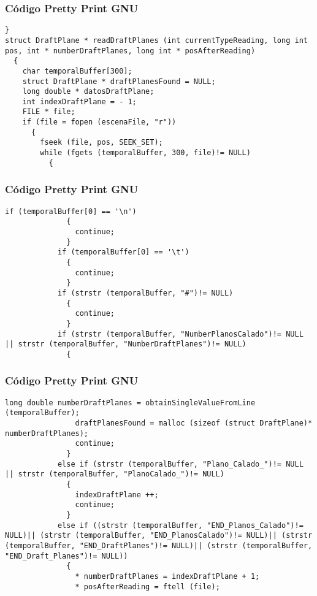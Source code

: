 \documentclass{beamer}
\begin{document}
\begin{frame}[fragile]
\frametitle{C\'odigo Pretty Print GNU}
\begin{lstlisting}[style=CStyle]
  }
struct DraftPlane * readDraftPlanes (int currentTypeReading, long int pos, int * numberDraftPlanes, long int * posAfterReading)
  {
    char temporalBuffer[300];
    struct DraftPlane * draftPlanesFound = NULL;
    long double * datosDraftPlane;
    int indexDraftPlane = - 1;
    FILE * file;
    if (file = fopen (escenaFile, "r"))
      {
        fseek (file, pos, SEEK_SET);
        while (fgets (temporalBuffer, 300, file)!= NULL)
          {
            \end{lstlisting}
\end{frame}
\begin{frame}[fragile]
\frametitle{C\'odigo Pretty Print GNU}
\begin{lstlisting}[style=CStyle]
            if (temporalBuffer[0] == '\n')
              {
                continue;
              }
            if (temporalBuffer[0] == '\t')
              {
                continue;
              }
            if (strstr (temporalBuffer, "#")!= NULL)
              {
                continue;
              }
            if (strstr (temporalBuffer, "NumberPlanosCalado")!= NULL || strstr (temporalBuffer, "NumberDraftPlanes")!= NULL)
              {
                \end{lstlisting}
\end{frame}
\begin{frame}[fragile]
\frametitle{C\'odigo Pretty Print GNU}
\begin{lstlisting}[style=CStyle]
                long double numberDraftPlanes = obtainSingleValueFromLine (temporalBuffer);
                draftPlanesFound = malloc (sizeof (struct DraftPlane)* numberDraftPlanes);
                continue;
              }
            else if (strstr (temporalBuffer, "Plano_Calado_")!= NULL || strstr (temporalBuffer, "PlanoCalado_")!= NULL)
              {
                indexDraftPlane ++;
                continue;
              }
            else if ((strstr (temporalBuffer, "END_Planos_Calado")!= NULL)|| (strstr (temporalBuffer, "END_PlanosCalado")!= NULL)|| (strstr (temporalBuffer, "END_DraftPlanes")!= NULL)|| (strstr (temporalBuffer, "END_Draft_Planes")!= NULL))
              {
                * numberDraftPlanes = indexDraftPlane + 1;
                * posAfterReading = ftell (file);
\end{lstlisting}
\end{frame}
\end{document}
